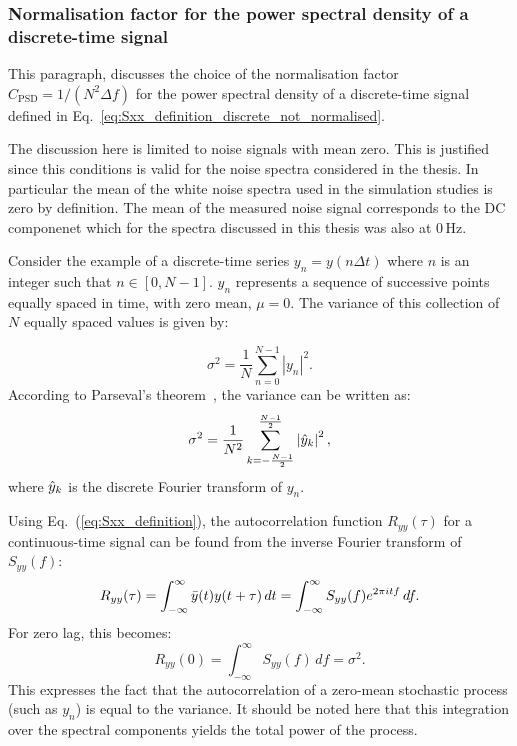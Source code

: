 \subsubsection*{Normalisation factor for the power spectral density of a discrete-time signal}\label{appendix_dft_normalisation}
This paragraph, discusses the choice of the normalisation factor $C_\mathrm{PSD}=1/(N^2 \Delta f)$ for the power spectral density of a discrete-time signal defined in Eq.~\eqref{eq:Sxx_definition_discrete_not_normalised}.

The discussion here is limited to noise signals with mean zero. This is justified since this conditions is valid for the noise spectra considered in the thesis. In particular the mean of the white noise spectra used in the simulation studies is zero by definition. The mean of the measured noise signal corresponds to the DC componenet which for the spectra discussed in this thesis was also at 0\,Hz.

Consider the example of a discrete-time series $y_n = y(n\Delta t)$ where $n$ is an integer such that $n \in [0, N-1]$. $y_n$ represents a sequence of successive points equally spaced in time, with zero mean, $\mu=0$. The variance of this collection of $N$ equally spaced values is given by:

\begin{equation}\label{eq:variance}
    \sigma^2 = \frac{1}{N}\sum_{n=0}^{N-1} \left | y_n \right |^2.
\end{equation}
According to Parseval's theorem~\cite{FFT_and_applications}, the variance can be written as:
\begin{equation}\label{eq:variance_2}
    \sigma^2 = \frac{1}{N^2}\sum_{k=-\frac{N-1}{2}}^{\frac{N-1}{2}} \left | \hat{y}_k \right |^2,
\end{equation}
where $\hat{y}_k$ is the discrete Fourier transform of $y_n$.

Using Eq.~(\ref{eq:Sxx_definition}), the autocorrelation function $R_{yy}(\tau)$ for a continuous-time signal can be found from the inverse Fourier transform of $S_{yy}(f)$:
\begin{equation}\label{eq:autocorrelation_ivnerse}
R_{yy}(\tau) = \int_{-\infty}^{\infty} \bar{y}(t) y(t+\tau) \, dt = \int_{-\infty}^{\infty} S_{yy}(f) e^{2\pi {i} t f} \, df.
\end{equation}
For zero lag, this becomes:
\begin{equation}\label{eq:autocorrelation_zero_lag}
R_{yy}(0) = \int_{-\infty}^{\infty} S_{yy}(f) \, df = \sigma^2.
\end{equation}
This expresses the fact that the autocorrelation of a zero-mean stochastic process (such as $y_n$) is equal to the variance. It should be noted here that this integration over the spectral components yields the total power of the process.

